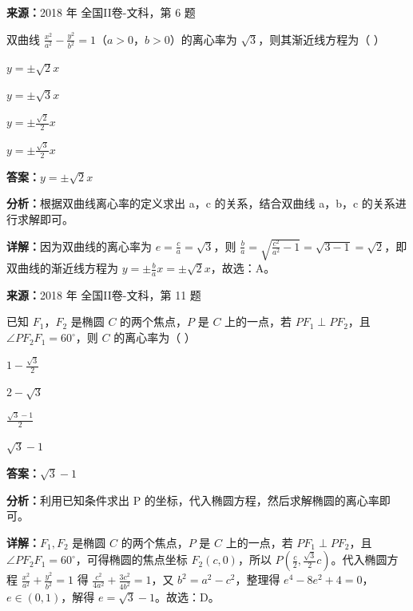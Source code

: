 \begin{question}[points=5]
\textbf{来源：}2018 年 全国II卷-文科，第 6 题\par
双曲线 $\frac{x^2}{a^2}-\frac{y^2}{b^2}=1$（$a>0$，$b>0$）的离心率为 $\sqrt{3}$，则其渐近线方程为（ ）
\begin{choices}
  \item $y=\pm\sqrt{2}x$
  \item $y=\pm\sqrt{3}x$
  \item $y=\pm\frac{\sqrt{2}}{2}x$
  \item $y=\pm\frac{\sqrt{3}}{2}x$
\end{choices}
\begin{solution}
\textbf{答案：}$y=\pm\sqrt{2}x$

\textbf{分析：}根据双曲线离心率的定义求出 a，c 的关系，结合双曲线 a，b，c 的关系进行求解即可。

\textbf{详解：}因为双曲线的离心率为 $e=\frac{c}{a}=\sqrt{3}$，则 $\frac{b}{a}=\sqrt{\frac{c^2}{a^2}-1}=\sqrt{3-1}=\sqrt{2}$，即双曲线的渐近线方程为 $y=\pm\frac{b}{a}x=\pm\sqrt{2}x$，故选：A。
\end{solution}
\end{question}

\begin{question}[points=5]
\textbf{来源：}2018 年 全国II卷-文科，第 11 题\par
已知 $F_1$，$F_2$ 是椭圆 $C$ 的两个焦点，$P$ 是 $C$ 上的一点，若 $PF_1\perp PF_2$，且 $\angle PF_2F_1=60^\circ$，则 $C$ 的离心率为（ ）
\begin{choices}
  \item $1-\frac{\sqrt{3}}{2}$
  \item $2-\sqrt{3}$
  \item $\frac{\sqrt{3}-1}{2}$
  \item $\sqrt{3}-1$
\end{choices}
\begin{solution}
\textbf{答案：}$\sqrt{3}-1$

\textbf{分析：}利用已知条件求出 P 的坐标，代入椭圆方程，然后求解椭圆的离心率即可。

\textbf{详解：}$F_1,F_2$ 是椭圆 $C$ 的两个焦点，$P$ 是 $C$ 上的一点，若 $PF_1\perp PF_2$，且 $\angle PF_2F_1=60^\circ$，可得椭圆的焦点坐标 $F_2(c,0)$，所以 $P(\frac{c}{2},\frac{\sqrt{3}}{2}c)$。代入椭圆方程 $\frac{x^2}{a^2}+\frac{y^2}{b^2}=1$ 得 $\frac{c^2}{4a^2}+\frac{3c^2}{4b^2}=1$，又 $b^2=a^2-c^2$，整理得 $e^4-8e^2+4=0$，$e\in(0,1)$，解得 $e=\sqrt{3}-1$。故选：D。
\end{solution}
\end{question}

